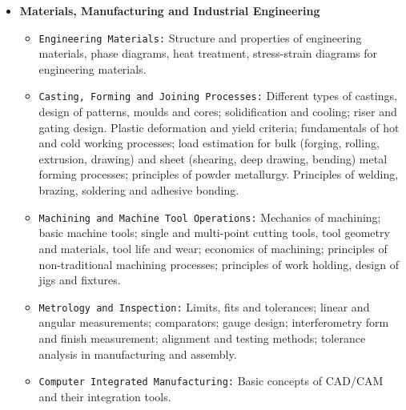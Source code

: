 \documentclass{article}
\begin{document}
{\begin{multicols}{2}
\begin{itemize}
\begin{itemize}
\item \texttt{Thermodynamics:} Thermodynamic systems and processes; properties of pure substances, behaviour of ideal and real gases; zeroth and first laws of thermodynamics, calculation of work and heat in various processes; second law of thermodynamics; thermodynamic property charts and tables, availability and irreversibility; thermodynamic relations.
\item \texttt{Applications:} Power Engineering: Air and gas compressors; vapour and gas power cycles, concepts of regeneration and reheat. I.C. Engines: Air-standard Otto, Diesel and dual cycles. Refrigeration and air-conditioning: Vapour and gas refrigeration and heat pump cycles; properties of moist air, psychrometric chart, basic psychrometric processes. Turbomachinery: Impulse and reaction principles, velocity diagrams, Pelton-wheel, Francis and Kaplan turbines.
\end{itemize}
\item \textbf{Materials, Manufacturing and Industrial Engineering}
\begin{itemize}
\item \texttt{Engineering Materials:} Structure and properties of engineering materials, phase diagrams, heat treatment, stress-strain diagrams for engineering materials.
\item \texttt{Casting, Forming and Joining Processes:} Different types of castings, design of patterns, moulds and cores; solidification and cooling; riser and gating design. Plastic deformation and yield criteria; fundamentals of hot and cold working processes; load estimation for bulk (forging, rolling, extrusion, drawing) and sheet (shearing, deep drawing, bending) metal forming processes; principles of powder metallurgy. Principles of welding, brazing, soldering and adhesive bonding.
\item \texttt{Machining and Machine Tool Operations:} Mechanics of machining; basic machine tools; single and multi-point cutting tools, tool geometry and materials, tool life and wear; economics of machining; principles of non-traditional machining processes; principles of work holding, design of jigs and fixtures.
\item \texttt{Metrology and Inspection:} Limits, fits and tolerances; linear and angular measurements; comparators; gauge design; interferometry form and finish measurement; alignment and testing methods; tolerance analysis in manufacturing and assembly.
\item \texttt{Computer Integrated Manufacturing:} Basic concepts of CAD/CAM and their integration tools.

\end{itemize}
\end{itemize}
\end{multicols}}
\end{document}
